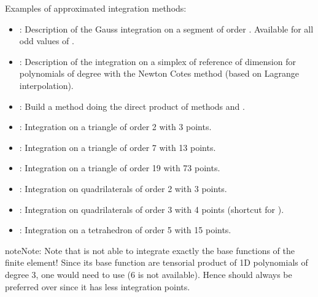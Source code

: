 \documentclass[a4paper,11pt,english]{sphinxmanual}
\begin{document}
Examples of approximated integration methods:
\begin{itemize}
\item {} 
:
Description of the Gauss integration on a segment of order . Available for
all odd values of .

\item {} 
:
Description of the integration on a simplex of reference of dimension  for
polynomials of degree  with the Newton Cotes method (based on Lagrange
interpolation).

\item {} 
:
Build a method doing the direct product of methods  and .

\item {} 
:
Integration on a triangle of order 2 with 3 points.

\item {} 
:
Integration on a triangle of order 7 with 13 points.

\item {} 
:
Integration on a triangle of order 19 with 73 points.

\item {} 
:
Integration on quadrilaterals of order 2 with 3 points.

\item {} 
:
Integration on quadrilaterals of order 3 with 4 points (shortcut for
).

\item {} 
:
Integration on a tetrahedron of order 5 with 15 points.

\end{itemize}

\begin{sphinxadmonition}{note}{Note:}
Note that  is not able to integrate exactly the base functions
of the  finite element! Since its base function are tensorial
product of 1D polynomials of degree 3, one would need to use 
(6 is not available). Hence  should always
be preferred over  since it has less integration points.
\end{sphinxadmonition}
\end{document}
